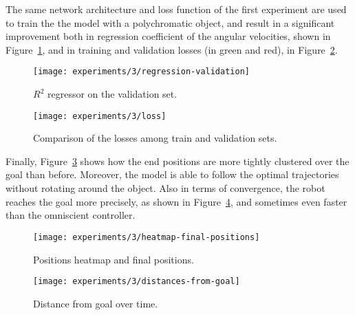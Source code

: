 The same network architecture and loss function of the first experiment are 
used to train the the model with a polychromatic object, and result in a 
significant improvement both in regression coefficient of the angular 
velocities, shown in Figure~\ref{fig:regression-3}, and in training and 
validation losses (in green and red), in Figure~\ref{fig:loss-3}.

\begin{figure}[htbp]
	\centerline{\texttt{[image: experiments/3/regression-validation]}}
	\caption{$R^2$ regressor on the validation set.}
	\label{fig:regression-3}
\end{figure}

\begin{figure}[htbp]
	\centerline{\texttt{[image: experiments/3/loss]}}
	\caption{Comparison of the losses among train and validation sets.}
	\label{fig:loss-3}
\end{figure}

Finally, Figure~\ref{fig:heatmap-final-positions} shows how the end positions 
are more tightly clustered over the goal than before. Moreover, the model is 
able to follow the optimal trajectories without rotating around the object.
Also in terms of convergence, the robot reaches the goal more precisely, as 
shown in Figure~\ref{fig:distance-from-goal-learned3}, and sometimes even 
faster than the omniscient controller.

\begin{figure}[htbp]
	\centerline{\texttt{[image: experiments/3/heatmap-final-positions]}}
	\caption{Positions heatmap and final positions.}
	\label{fig:heatmap-final-positions}
\end{figure}

\begin{figure}[htbp]
	\centerline{\texttt{[image: experiments/3/distances-from-goal]}}
	\caption{Distance from goal over time.}
	\label{fig:distance-from-goal-learned3}
\end{figure}